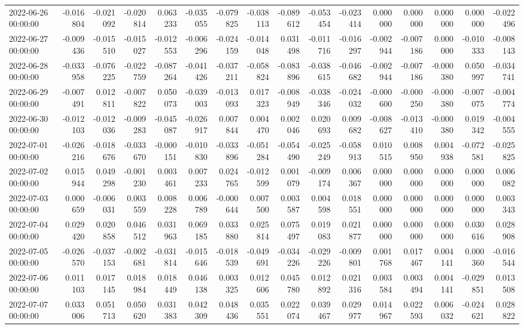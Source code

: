 \begin{tabular}{lrrrrrrrrrrrrrrr}
2022-06-26 00:00:00 & -0.016804 & -0.021092 & -0.020814 & 0.063233 & -0.035055 & -0.079825 & -0.038113 & -0.089612 & -0.053454 & -0.023414 & 0.000000 & 0.000000 & 0.000000 & 0.000000 & -0.022496 \\
2022-06-27 00:00:00 & -0.009436 & -0.015510 & -0.015027 & -0.012553 & -0.006296 & -0.024159 & -0.014048 & 0.031498 & -0.011716 & -0.016297 & -0.002944 & -0.007186 & 0.000000 & -0.010333 & -0.008143 \\
2022-06-28 00:00:00 & -0.033958 & -0.076225 & -0.022759 & -0.087264 & -0.041426 & -0.037211 & -0.058824 & -0.083896 & -0.038615 & -0.046682 & -0.002944 & -0.007186 & -0.000380 & 0.050997 & -0.034741 \\
2022-06-29 00:00:00 & -0.007491 & 0.012811 & -0.007822 & 0.050073 & -0.039003 & -0.013093 & 0.017323 & -0.008949 & -0.038346 & -0.024032 & -0.000600 & -0.000250 & -0.000380 & -0.007075 & -0.004774 \\
2022-06-30 00:00:00 & -0.012103 & -0.012036 & -0.009283 & -0.045087 & -0.026917 & 0.007844 & 0.004470 & 0.002046 & 0.020693 & 0.009682 & -0.008627 & -0.013410 & -0.000380 & 0.019342 & -0.004555 \\
2022-07-01 00:00:00 & -0.026216 & -0.018676 & -0.033670 & -0.000151 & -0.010830 & -0.033896 & -0.051284 & -0.054490 & -0.025249 & -0.058913 & 0.010515 & 0.008950 & 0.004938 & -0.072581 & -0.025825 \\
2022-07-02 00:00:00 & 0.015944 & 0.049298 & -0.001230 & 0.003461 & 0.007233 & 0.024765 & -0.012599 & 0.001079 & -0.009174 & 0.006367 & 0.000000 & 0.000000 & 0.000000 & 0.000000 & 0.006082 \\
2022-07-03 00:00:00 & 0.000659 & -0.006031 & 0.003559 & 0.008228 & 0.006789 & -0.000644 & 0.007500 & 0.003587 & 0.004598 & 0.018551 & 0.000000 & 0.000000 & 0.000000 & 0.000000 & 0.003343 \\
2022-07-04 00:00:00 & 0.029420 & 0.020858 & 0.046512 & 0.031963 & 0.069185 & 0.033880 & 0.025814 & 0.075497 & 0.019083 & 0.021877 & 0.000000 & 0.000000 & 0.000000 & 0.030616 & 0.028908 \\
2022-07-05 00:00:00 & -0.026570 & -0.037153 & -0.002681 & -0.031814 & -0.015646 & -0.018539 & -0.049691 & -0.034226 & -0.029226 & -0.009801 & 0.001768 & 0.017467 & 0.004141 & 0.000360 & -0.016544 \\
2022-07-06 00:00:00 & 0.011103 & 0.017145 & 0.018984 & 0.018449 & 0.046138 & 0.003325 & 0.012606 & 0.045780 & 0.012892 & 0.021316 & 0.003584 & 0.003494 & 0.004141 & -0.029851 & 0.013508 \\
2022-07-07 00:00:00 & 0.033006 & 0.051713 & 0.050620 & 0.031383 & 0.042309 & 0.048436 & 0.035551 & 0.022074 & 0.039467 & 0.029977 & 0.014967 & 0.022593 & 0.006032 & -0.024621 & 0.028822 \\

\end{tabular}
